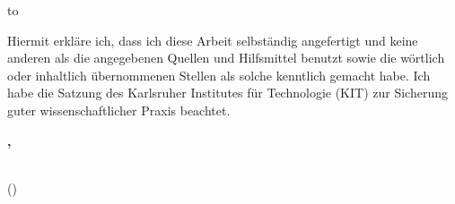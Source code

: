 %
%

\thispagestyle{empty}
\vspace*{33\baselineskip}
\hbox to \textwidth{\hrulefill}
\par



Hiermit erkläre ich, dass ich diese Arbeit selbständig angefertigt und keine anderen als
die angegebenen Quellen und Hilfsmittel benutzt sowie die wörtlich oder inhaltlich
übernommenen Stellen als solche kenntlich gemacht habe. Ich habe die Satzung
des Karlsruher Institutes für Technologie (KIT) zur Sicherung guter wissenschaftlicher Praxis beachtet.

\textbf{\submissionlocation, \submissiontime}
\vspace{1.5cm}

\dotfill\hspace*{8.0cm}\\
\hspace*{2cm}(\textbf{\myname}) %
